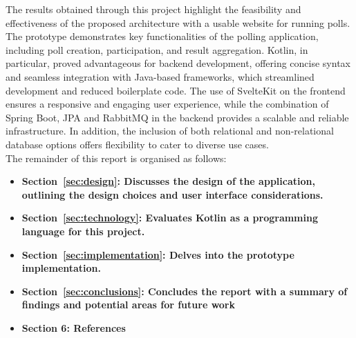 The results obtained through this project highlight the feasibility and effectiveness of the proposed architecture with a usable website for running polls.
The prototype demonstrates key functionalities of the polling application, including poll creation, participation, and result aggregation.
Kotlin, in particular, proved advantageous for backend development, offering concise syntax and seamless integration with Java-based frameworks, which streamlined development and reduced boilerplate code.
The use of SvelteKit on the frontend ensures a responsive and engaging user experience, while the combination of Spring Boot, JPA and RabbitMQ in the backend provides a scalable and reliable infrastructure.
In addition, the inclusion of both relational and non-relational database options offers flexibility to cater to diverse use cases. \\

The remainder of this report is organised as follows:
\begin{itemize}
    \item \textbf{Section~\ref{sec:design}: Discusses the design of the application, outlining the design choices and user interface considerations.}
    \item \textbf{Section~\ref{sec:technology}: Evaluates Kotlin as a programming language for this project.}
    \item \textbf{Section~\ref{sec:implementation}: Delves into the prototype implementation.}
    \item \textbf{Section~\ref{sec:conclusions}: Concludes the report with a summary of findings and potential areas for future work}
    \item \textbf{Section 6: References}
\end{itemize}
